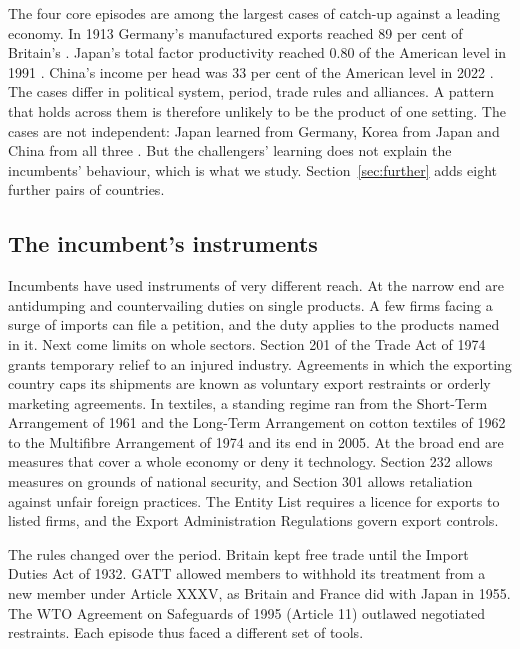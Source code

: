 \documentclass[review,authoryear,12pt]{elsarticle}
\begin{document}
The four core episodes are among the largest cases of catch-up against a leading economy. In 1913 Germany's manufactured exports reached 89 per cent of Britain's \citep{tyszynski1951}. Japan's total factor productivity reached 0.80 of the American level in 1991 \citep{pwt110}. China's income per head was 33 per cent of the American level in 2022 \citep{bolt2024}. The cases differ in political system, period, trade rules and alliances. A pattern that holds across them is therefore unlikely to be the product of one setting. The cases are not independent: Japan learned from Germany, Korea from Japan and China from all three \citep{kohli1994}. But the challengers' learning does not explain the incumbents' behaviour, which is what we study. Section~\ref{sec:further} adds eight further pairs of countries.

\subsection{The incumbent's instruments}

Incumbents have used instruments of very different reach. At the narrow end are antidumping and countervailing duties on single products. A few firms facing a surge of imports can file a petition, and the duty applies to the products named in it. Next come limits on whole sectors. Section 201 of the Trade Act of 1974 grants temporary relief to an injured industry. Agreements in which the exporting country caps its shipments are known as voluntary export restraints or orderly marketing agreements. In textiles, a standing regime ran from the Short-Term Arrangement of 1961 and the Long-Term Arrangement on cotton textiles of 1962 to the Multifibre Arrangement of 1974 and its end in 2005. At the broad end are measures that cover a whole economy or deny it technology. Section 232 allows measures on grounds of national security, and Section 301 allows retaliation against unfair foreign practices. The Entity List requires a licence for exports to listed firms, and the Export Administration Regulations govern export controls.

The rules changed over the period. Britain kept free trade until the Import Duties Act of 1932. GATT allowed members to withhold its treatment from a new member under Article XXXV, as Britain and France did with Japan in 1955. The WTO Agreement on Safeguards of 1995 (Article 11) outlawed negotiated restraints. Each episode thus faced a different set of tools.

\end{document}
